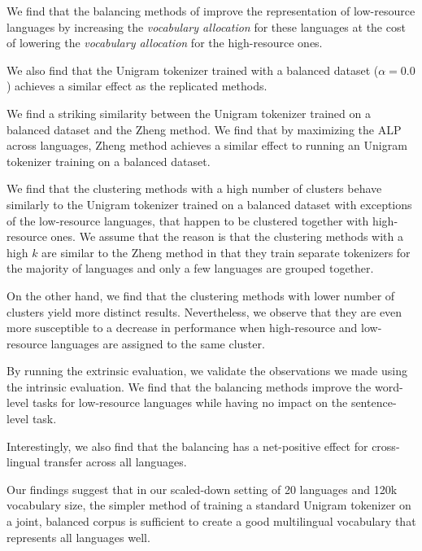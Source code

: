 We find that the balancing methods of \citet{chung_improving_2020,zheng_allocating_2021,liang_xlm-v_2023} improve the representation of low-resource languages by increasing the \textit{vocabulary allocation} for these languages at the cost of lowering the \textit{vocabulary allocation} for the high-resource ones. 

We also find that the Unigram tokenizer trained with a balanced dataset ($\alpha=0.0$) achieves a similar effect as the replicated methods. 

We find a striking similarity between the Unigram tokenizer trained on a balanced dataset and the Zheng method. We find that by maximizing the ALP across languages, Zheng method achieves a similar effect to running an Unigram tokenizer training on a balanced dataset.

We find that the clustering methods with a high number of clusters behave similarly to the Unigram tokenizer trained on a balanced dataset with exceptions of the low-resource languages, that happen to be clustered together with high-resource ones. We assume that the reason is that the clustering methods with a high $k$ are similar to the Zheng method in that they train separate tokenizers for the majority of languages and only a few languages are grouped together.

On the other hand, we find that the clustering methods with lower number of clusters yield more distinct results. Nevertheless, we observe that they are even more susceptible to a decrease in performance when high-resource and low-resource languages are assigned to the same cluster.

By running the extrinsic evaluation, we validate the observations we made using the intrinsic evaluation. We find that the balancing methods improve the word-level tasks for low-resource languages while having no impact on the sentence-level task. 

Interestingly, we also find that the balancing has a net-positive effect for cross-lingual transfer across all languages.

Our findings suggest that in our scaled-down setting of 20 languages and 120k vocabulary size, the simpler method of training a standard Unigram tokenizer on a joint, balanced corpus is sufficient to create a good multilingual vocabulary that represents all languages well.



